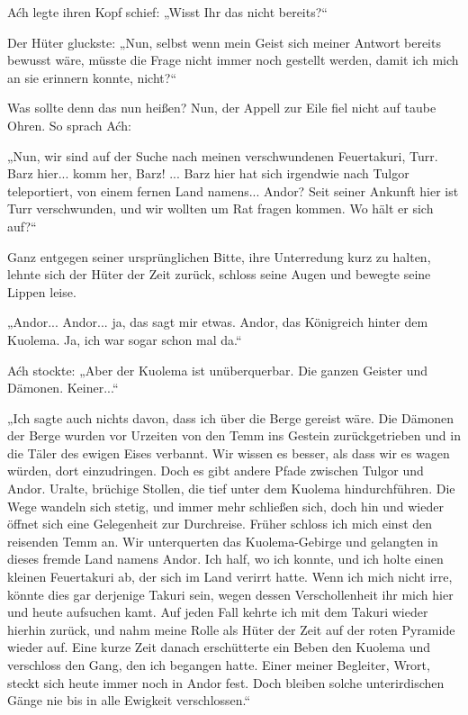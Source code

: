 Aćh legte ihren Kopf schief: „Wisst Ihr das nicht bereits?“

Der Hüter gluckste: „Nun, selbst wenn mein Geist sich meiner Antwort bereits bewusst wäre, müsste die Frage nicht immer noch gestellt werden, damit ich mich an sie erinnern konnte, nicht?“

Was sollte denn das nun heißen? Nun, der Appell zur Eile fiel nicht auf taube Ohren. So sprach Aćh:

„Nun, wir sind auf der Suche nach meinen verschwundenen Feuertakuri, Turr. Barz hier... komm her, Barz! ... Barz hier hat sich irgendwie nach Tulgor teleportiert, von einem fernen Land namens... Andor? Seit seiner Ankunft hier ist Turr verschwunden, und wir wollten um Rat fragen kommen. Wo hält er sich auf?“

Ganz entgegen seiner ursprünglichen Bitte, ihre Unterredung kurz zu halten, lehnte sich der Hüter der Zeit zurück, schloss seine Augen und bewegte seine Lippen leise.

„Andor... Andor... ja, das sagt mir etwas. Andor, das Königreich hinter dem Kuolema. Ja, ich war sogar schon mal da.“

Aćh stockte: „Aber der Kuolema ist unüberquerbar. Die ganzen Geister und Dämonen. Keiner...“

„Ich sagte auch nichts davon, dass ich über die Berge gereist wäre. Die Dämonen der Berge wurden vor Urzeiten von den Temm ins Gestein zurückgetrieben und in die Täler des ewigen Eises verbannt. Wir wissen es besser, als dass wir es wagen würden, dort einzudringen. Doch es gibt andere Pfade zwischen Tulgor und Andor. Uralte, brüchige Stollen, die tief unter dem Kuolema hindurchführen. Die Wege wandeln sich stetig, und immer mehr schließen sich, doch hin und wieder öffnet sich eine Gelegenheit zur Durchreise. Früher schloss ich mich einst den reisenden Temm an. Wir unterquerten das Kuolema-Gebirge und gelangten in dieses fremde Land namens Andor. Ich half, wo ich konnte, und ich holte einen kleinen Feuertakuri ab, der sich im Land verirrt hatte. Wenn ich mich nicht irre, könnte dies gar derjenige Takuri sein, wegen dessen Verschollenheit ihr mich hier und heute aufsuchen kamt. Auf jeden Fall kehrte ich mit dem Takuri wieder hierhin zurück, und nahm meine Rolle als Hüter der Zeit auf der roten Pyramide wieder auf. Eine kurze Zeit danach erschütterte ein Beben den Kuolema und verschloss den Gang, den ich begangen hatte. Einer meiner Begleiter, Wrort, steckt sich heute immer noch in Andor fest. Doch bleiben solche unterirdischen Gänge nie bis in alle Ewigkeit verschlossen.“

